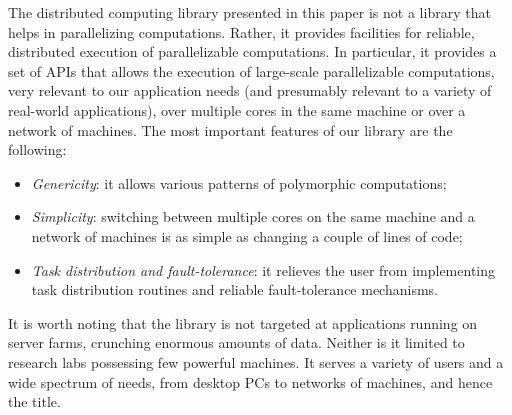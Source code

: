 \documentclass[preprint]{sigplanconf}
\begin{document}
The distributed computing library presented in this paper is not a
library that helps in parallelizing computations. Rather, it provides
facilities for reliable, distributed execution of parallelizable
computations. In particular, it provides a set of APIs that allows the
execution of large-scale parallelizable computations, very relevant to
our application needs (and presumably relevant to a variety of
real-world applications), over multiple cores in the same machine or
over a network of machines. 
The most important features of our library are the following:
\begin{itemize}
\item \emph{Genericity}: 
  it allows various patterns of polymorphic computations;
\item \emph{Simplicity}: switching between multiple cores on the same
  machine and a network of machines is as simple as changing a couple
  of lines of code;
\item \emph{Task distribution and fault-tolerance}: 
  it relieves the user from implementing task distribution routines
  and reliable fault-tolerance mechanisms.
\end{itemize}
It is worth noting that the library is not targeted at applications
running on server farms, crunching enormous amounts of data. Neither
is it limited to research labs possessing few powerful
machines. It serves a variety of users and a wide
spectrum of needs, from desktop PCs to networks of machines, and hence
the title.




\end{document}
